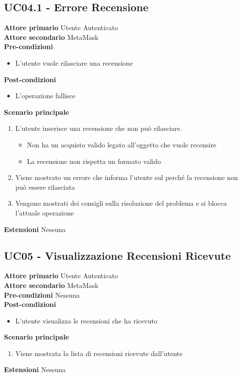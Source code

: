 \subsection{UC04.1 - Errore Recensione}
\textbf{Attore primario} Utente Autenticato \\
\textbf{Attore secondario} MetaMask \\
\textbf{Pre-condizioni}
\begin{itemize}
    \item L'utente vuole rilasciare una recensione
\end{itemize}
\textbf{Post-condizioni}
\begin{itemize}
    \item L'operazione fallisce
\end{itemize}
\textbf{Scenario principale}
\begin{enumerate}
    \item L'utente inserisce una recensione che non può rilasciare.
          \begin{itemize}
              \item Non ha un acquisto valido legato all'oggetto che vuole recensire
              \item La recensione non rispetta un formato valido
          \end{itemize}
    \item Viene mostrato un errore che informa l'utente sul perché la recensione non può
          essere rilasciata
    \item Vengono mostrati dei consigli sulla risoluzione del problema e si blocca
          l'attuale operazione
\end{enumerate}
\textbf{Estensioni} Nessuna

\subsection{UC05 - Visualizzazione Recensioni Ricevute}
\textbf{Attore primario} Utente Autenticato \\
\textbf{Attore secondario} MetaMask \\
\textbf{Pre-condizioni} Nessuna \\
\textbf{Post-condizioni}
\begin{itemize}
    \item L'utente visualizza le recensioni che ha ricevuto
\end{itemize}
\textbf{Scenario principale}
\begin{enumerate}
    \item Viene mostrata la lista di recensioni ricevute dall'utente
\end{enumerate}
\textbf{Estensioni}
Nessuna


